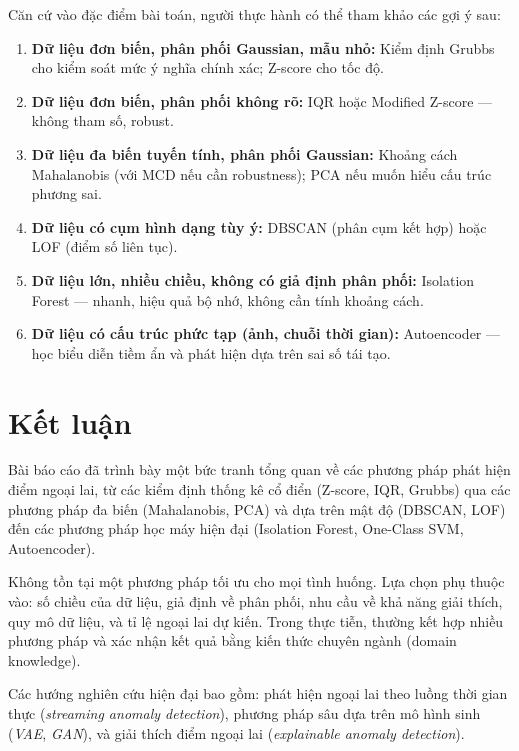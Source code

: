 \documentclass[11pt,a4paper]{article}
\begin{document}
Căn cứ vào đặc điểm bài toán, người thực hành có thể tham khảo các gợi ý sau:

\begin{enumerate}[noitemsep]
  \item \textbf{Dữ liệu đơn biến, phân phối Gaussian, mẫu nhỏ:} Kiểm định Grubbs cho kiểm soát mức ý nghĩa chính xác; Z-score cho tốc độ.
  \item \textbf{Dữ liệu đơn biến, phân phối không rõ:} IQR hoặc Modified Z-score --- không tham số, robust.
  \item \textbf{Dữ liệu đa biến tuyến tính, phân phối Gaussian:} Khoảng cách Mahalanobis (với MCD nếu cần robustness); PCA nếu muốn hiểu cấu trúc phương sai.
  \item \textbf{Dữ liệu có cụm hình dạng tùy ý:} DBSCAN (phân cụm kết hợp) hoặc LOF (điểm số liên tục).
  \item \textbf{Dữ liệu lớn, nhiều chiều, không có giả định phân phối:} Isolation Forest --- nhanh, hiệu quả bộ nhớ, không cần tính khoảng cách.
  \item \textbf{Dữ liệu có cấu trúc phức tạp (ảnh, chuỗi thời gian):} Autoencoder --- học biểu diễn tiềm ẩn và phát hiện dựa trên sai số tái tạo.
\end{enumerate}

\section{Kết luận}

Bài báo cáo đã trình bày một bức tranh tổng quan về các phương pháp phát hiện điểm ngoại lai, từ các kiểm định thống kê cổ điển (Z-score, IQR, Grubbs) qua các phương pháp đa biến (Mahalanobis, PCA) và dựa trên mật độ (DBSCAN, LOF) đến các phương pháp học máy hiện đại (Isolation Forest, One-Class SVM, Autoencoder).

Không tồn tại một phương pháp tối ưu cho mọi tình huống. Lựa chọn phụ thuộc vào:
số chiều của dữ liệu, giả định về phân phối, nhu cầu về khả năng giải thích, quy mô dữ liệu, và tỉ lệ ngoại lai dự kiến.
Trong thực tiễn, thường kết hợp nhiều phương pháp và xác nhận kết quả bằng kiến thức chuyên ngành (domain knowledge).

Các hướng nghiên cứu hiện đại bao gồm: phát hiện ngoại lai theo luồng thời gian thực (\textit{streaming anomaly detection}), phương pháp sâu dựa trên mô hình sinh (\textit{VAE}, \textit{GAN}), và giải thích điểm ngoại lai (\textit{explainable anomaly detection}).

\printbibliography[title={Tài liệu tham khảo}]
\end{document}
